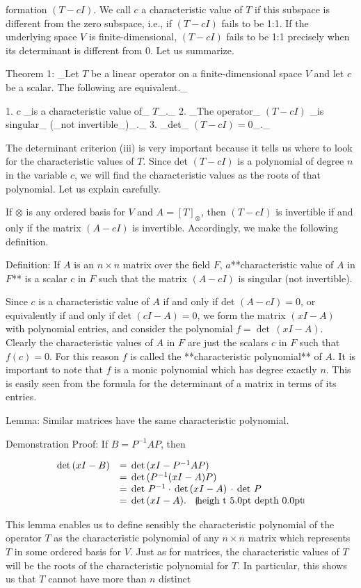formation \((T-cI)\). We call \(c\) a characteristic value of \(T\) if this subspace is different from the zero subspace, i.e., if \((T-cI)\) fails to be 1:1. If the underlying space \(V\) is finite-dimensional, \((T-cI)\) fails to be 1:1 precisely when its determinant is different from 0. Let us summarize.

Theorem 1: _Let \(T\) be a linear operator on a finite-dimensional space \(V\) and let \(c\) be a scalar. The following are equivalent._

1. \(c\) _is a characteristic value of_ \(T\)_._
2. _The operator_ \((T-cI)\) _is singular_ (_not invertible_)_._
3. _det_ \((T-cI)=0\)_._

The determinant criterion (iii) is very important because it tells us where to look for the characteristic values of \(T\). Since det \((T-cI)\) is a polynomial of degree \(n\) in the variable \(c\), we will find the characteristic values as the roots of that polynomial. Let us explain carefully.

If \(\otimes\) is any ordered basis for \(V\) and \(A=[T]_{\otimes}\), then \((T-cI)\) is invertible if and only if the matrix \((A-cI)\) is invertible. Accordingly, we make the following definition.

Definition: If \(A\) is an \(n\times n\) matrix over the field \(F\), \(a\)**characteristic value of \(A\) in \(F\)** is a scalar \(c\) in \(F\) such that the matrix \((A-cI)\) is singular (not invertible).

Since \(c\) is a characteristic value of \(A\) if and only if det \((A-cI)=0\), or equivalently if and only if det \((cI-A)=0\), we form the matrix \((xI-A)\) with polynomial entries, and consider the polynomial \(f=\det\,(xI-A)\). Clearly the characteristic values of \(A\) in \(F\) are just the scalars \(c\) in \(F\) such that \(f(c)=0\). For this reason \(f\) is called the **characteristic polynomial** of \(A\). It is important to note that \(f\) is a monic polynomial which has degree exactly \(n\). This is easily seen from the formula for the determinant of a matrix in terms of its entries.

Lemma: Similar matrices have the same characteristic polynomial.

Demonstration Proof: If \(B=P^{-1}AP\), then

\[\begin{array}{rl}\det\,(xI-B)&=\,\det\,(xI-P^{-1}AP)\\ &=\,\det\,(P^{-1}(xI-A)P)\\ &=\,\det\,P^{-1}\cdot\,\det\,(xI-A)\,\cdot\,\det\,P\\ &=\,\det\,(xI-A).\quad\hbox{\vrule width 0.5pt height 5.0pt depth 0.0pt\vrule width 0.5pt heigh t 5.0pt depth 0.0pt\vrule width 0.5pt height 5.0pt depth 0.0pt}\end{array}\]

This lemma enables us to define sensibly the characteristic polynomial of the operator \(T\) as the characteristic polynomial of any \(n\times n\) matrix which represents \(T\) in some ordered basis for \(V\). Just as for matrices, the characteristic values of \(T\) will be the roots of the characteristic polynomial for \(T\). In particular, this shows us that \(T\) cannot have more than \(n\) distinct 